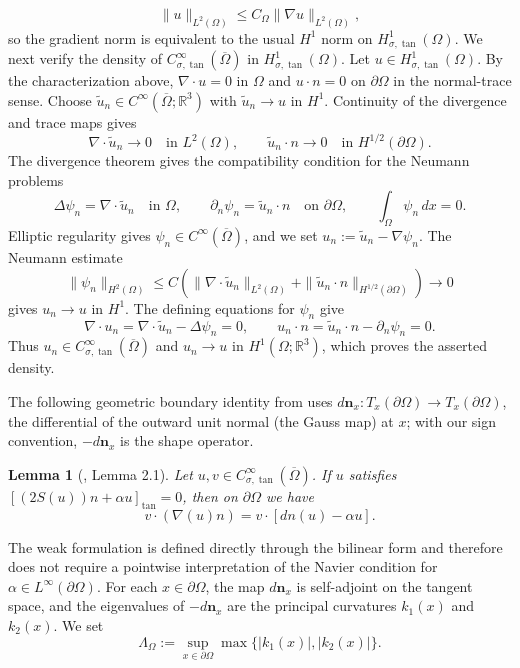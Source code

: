 \documentclass[11pt,reqno]{amsart}
\theoremstyle{plain}
\newtheorem{lemma}[thm]{Lemma}
\numberwithin{equation}{section}
\newcommand{\nn}{{n}}
\newcommand{\tanproj}{\text{tan}}
\newcommand{\navierbc}{\left[(2S({u}))\nn + \alpha {u}\right]_{\tanproj} = 0}
\begin{document}
\[
\|u\|_{L^2(\Omega)}\le C_\Omega\|\nabla u\|_{L^2(\Omega)},
\]
so the gradient norm is equivalent to the usual $H^1$ norm on $H^1_{\sigma,\tan}(\Omega)$. We next verify the density of $C^\infty_{\sigma,\tan}(\overline\Omega)$ in $H^1_{\sigma,\tan}(\Omega)$. Let $u\in H^1_{\sigma,\tan}(\Omega)$. By the characterization above,
$\nabla\cdot u=0$ in $\Omega$ and $u\cdot n=0$ on $\partial\Omega$ in the
normal-trace sense. Choose $\widetilde u_n\in C^\infty(\overline\Omega;\mathbb R^3)$ with $\widetilde u_n\to u$ in $H^1$. Continuity of the divergence and trace maps gives
\[
\nabla\cdot\widetilde u_n\to0\quad\text{in }L^2(\Omega),
\qquad
\widetilde u_n\cdot n\to0\quad\text{in }H^{1/2}(\partial\Omega).
\]
The divergence theorem gives the compatibility condition for the Neumann problems
\[
\Delta\psi_n=\nabla\cdot\widetilde u_n\quad\text{in }\Omega,
\qquad
\partial_n\psi_n=\widetilde u_n\cdot n\quad\text{on }\partial\Omega,
\qquad
\int_\Omega\psi_n\,dx=0.
\]
Elliptic regularity gives $\psi_n\in C^\infty(\overline\Omega)$, and we set $u_n:=\widetilde u_n-\nabla\psi_n$. The Neumann estimate
\[
\|\psi_n\|_{H^2(\Omega)}
\le C\left(
\|\nabla\cdot\widetilde u_n\|_{L^2(\Omega)}
+\|\widetilde u_n\cdot n\|_{H^{1/2}(\partial\Omega)}
\right)
\longrightarrow0
\]
gives $u_n\to u$ in $H^1$. The defining equations for $\psi_n$ give
\[
\nabla\cdot u_n=\nabla\cdot\widetilde u_n-\Delta\psi_n=0,
\qquad
u_n\cdot n=\widetilde u_n\cdot n-\partial_n\psi_n=0.
\]
Thus $u_n\in C^\infty_{\sigma,\tan}(\overline\Omega)$ and $u_n\to u$ in
$H^1(\Omega;\mathbb R^3)$, which proves the asserted density.

The following geometric boundary identity from \cite{Kelliher2025}
uses $d\boldsymbol n_x:T_x(\partial\Omega)\to T_x(\partial\Omega)$, the
differential of the outward unit normal (the Gauss map) at $x$; with our sign
convention, $-d\boldsymbol n_x$ is the shape operator.

\begin{lemma}[\cite{Kelliher2025}, Lemma 2.1] \label{lem:boundary_identity}
Let $u, v \in C^\infty_{\sigma,\tan}(\overline{\Omega})$. If $u$ satisfies $\navierbc$, then on $\partial\Omega$ we have
\[
v\cdot(\nabla(u)\nn)=v\cdot [d\nn(u)-\alpha u].
\]
\end{lemma}
The weak formulation is defined directly through the bilinear form and
therefore does not require a pointwise interpretation of the Navier condition
for $\alpha\in L^\infty(\partial\Omega)$. For each $x\in\partial\Omega$, the
map $d\boldsymbol n_x$ is self-adjoint on the tangent space, and the
eigenvalues of $-d\boldsymbol n_x$ are the principal curvatures $k_1(x)$ and
$k_2(x)$. We set
\[
\Lambda_\Omega:=\sup_{x\in\partial\Omega}\max\{|k_1(x)|,|k_2(x)|\}.
\]
\end{document}
